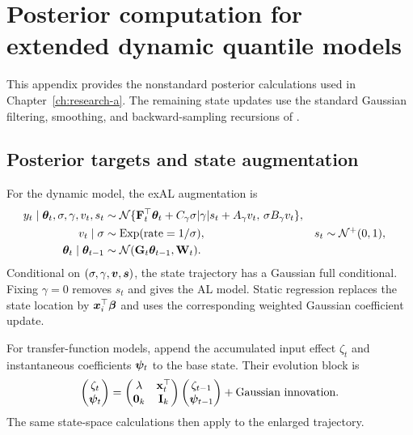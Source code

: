 \chapter{Posterior computation for extended dynamic quantile models}
\label{app:exdqlm-technical}

This appendix provides the nonstandard posterior calculations used in
Chapter~\ref{ch:research-a}. The remaining state updates use the standard
Gaussian filtering, smoothing, and backward-sampling recursions of
\citet{exd-west1997bayesian}.

\section{Posterior targets and state augmentation}
\label{app:exdqlm-posterior}

For the dynamic model, the exAL augmentation is
\begin{align}
y_t\mid\boldsymbol{\theta}_t,\sigma,\gamma,v_t,s_t
&\sim\mathcal{N}\{\mathbf{F}_t^\top\boldsymbol{\theta}_t+C_\gamma\sigma|\gamma|s_t
 +A_\gamma v_t,\,\sigma B_\gamma v_t\},\nonumber\\
v_t\mid\sigma&\sim\operatorname{Exp}(\text{rate}=1/\sigma),
&s_t&\sim\mathcal{N}^{+}(0,1),\nonumber\\
\boldsymbol{\theta}_t\mid\boldsymbol{\theta}_{t-1}
&\sim\mathcal{N}(\mathbf{G}_t\boldsymbol{\theta}_{t-1},\mathbf{W}_t).
\label{exd:eq:dyn_exdqlm_joint}
\end{align}
Conditional on \((\sigma,\gamma,\boldsymbol{v},\boldsymbol{s})\), the state trajectory has
a Gaussian full conditional. Fixing \(\gamma=0\) removes \(s_t\) and gives
the AL model. Static regression replaces the state location by
\(\boldsymbol{x}_i^\top\boldsymbol{\beta}\) and uses the corresponding weighted Gaussian
coefficient update.

For transfer-function models, append the accumulated input effect \(\zeta_t\)
and instantaneous coefficients \(\boldsymbol{\psi}_t\) to the base state. Their
evolution block is
\begin{equation}
\begin{pmatrix}\zeta_t\\\boldsymbol{\psi}_t\end{pmatrix}
=
\begin{pmatrix}\lambda&\mathbf{x}_t^\top\\\mathbf{0}_k&\mathbf{I}_k\end{pmatrix}
\begin{pmatrix}\zeta_{t-1}\\\boldsymbol{\psi}_{t-1}\end{pmatrix}
+\text{Gaussian innovation}.
\label{exd:eq:tf_aug_state}
\end{equation}
The same state-space calculations then apply to the enlarged trajectory.

